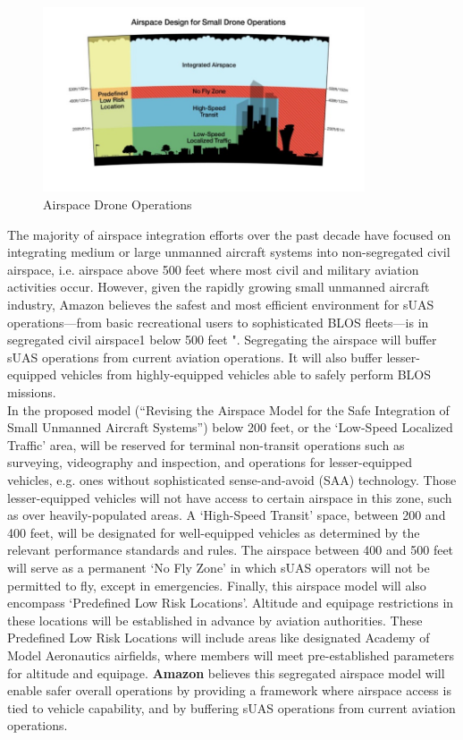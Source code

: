 \documentclass[conference]{IEEEtran}
\begin{document}
\begin{figure}[!t]
\centering
\includegraphics[width=0.85\textwidth]{airspace-design-small-drone-operations}
\caption{Airspace Drone Operations}
\label{fig_airspace_drone_operations}
\end{figure}

The majority of airspace integration efforts over the past decade have focused on integrating medium or large unmanned aircraft systems into non-segregated civil airspace, i.e. airspace above 500 feet where most civil and military aviation activities occur. However, given the rapidly growing small unmanned aircraft industry, Amazon believes the safest and most efficient environment for sUAS operations—from basic recreational users to sophisticated BLOS fleets—is in segregated civil airspace1 below 500 feet ". Segregating the airspace will buffer sUAS operations from current aviation operations. It will also buffer lesser-equipped vehicles from highly-equipped vehicles able to safely perform BLOS missions.\\

In the proposed model (``Revising the Airspace Model for the Safe Integration of Small Unmanned Aircraft Systems'') below 200 feet, or the `Low-Speed Localized Traffic' area, will be reserved for terminal non-transit operations such as surveying, videography and inspection, and operations for lesser-equipped vehicles, e.g. ones without sophisticated sense-and-avoid (SAA) technology. Those lesser-equipped vehicles will not have access to certain airspace in this zone, such as over heavily-populated areas.
A `High-Speed Transit' space, between 200 and 400 feet, will be designated for well-equipped vehicles as determined by the relevant performance standards and rules.
The airspace between 400 and 500 feet will serve as a permanent `No Fly Zone' in which sUAS operators will not be permitted to fly, except in emergencies.
Finally, this airspace model will also encompass `Predefined Low Risk Locations'. Altitude and equipage restrictions in these locations will be established in advance by aviation authorities. These Predefined Low Risk Locations will include areas like designated Academy of Model Aeronautics airfields, where members will meet pre-established parameters for altitude and equipage.
\textbf{Amazon} believes this segregated airspace model will enable safer overall operations by providing a framework where airspace access is tied to vehicle capability, and by buffering sUAS operations from current aviation operations.\\
\end{document}
